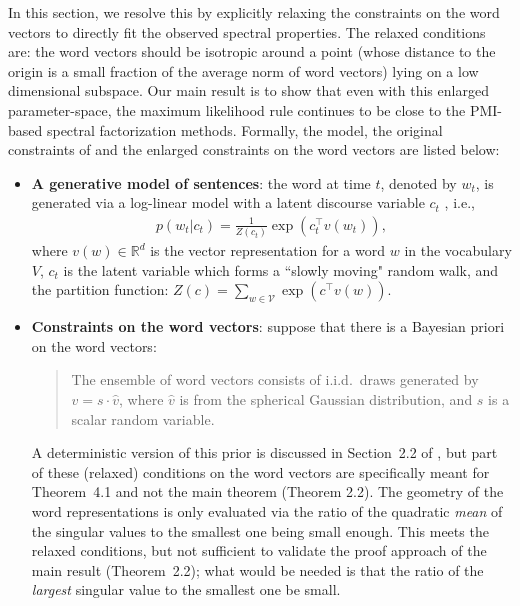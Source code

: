 \documentclass{article} \usepackage{acl2017,times}
\begin{document}
In this section, we  resolve this by explicitly  relaxing the constraints on the word vectors to directly fit the observed spectral properties.  The relaxed conditions are: the word vectors should be isotropic around a point (whose distance to the origin is a  small fraction of the average norm of word vectors) lying on a low dimensional subspace. Our main result is to show that even with this enlarged parameter-space, the maximum likelihood rule continues to be close to the PMI-based spectral factorization methods.  
Formally,  the model, the original constraints of \citep{arora2015rand} and the enlarged constraints on the word vectors are listed  below: 
\begin{itemize}\item {\bf A generative model of sentences}: the word at time $t$, denoted by $w_t$, is generated via a log-linear model with a latent discourse variable $c_t$ \citep{arora2015rand}, i.e.,
    \begin{align}
      p(w_t|c_t) = \frac{1}{Z(c_t)} \exp\left(c_t^{\top}v(w_t)\right), \label{eq:model}
    \end{align}
    where $v(w) \in \mathbb{R}^d$ is the vector representation for a word $w$ in the vocabulary $V$, $c_t$ is the latent variable which forms a ``slowly moving" random walk, and  the partition function:  $Z(c) = \sum_{w\in \mathcal{V}}\exp\left(c^{\top}v(w)\right)$.
    \item {\bf Constraints on the word vectors}: \citep{arora2015rand} suppose that there is a Bayesian priori on the word vectors: 
    \begin{quote}
      The ensemble of word vectors consists of i.i.d.\ draws generated by $v = s\cdot \hat{v}$, where $\hat{v}$ is from the spherical Gaussian distribution, and $s$ is a scalar random variable.
    \end{quote}
A deterministic version of this  prior is  discussed in Section~2.2 of \citep{arora2015rand}, but part of these (relaxed) conditions on the word vectors are specifically meant for Theorem~4.1 and not the main theorem (Theorem 2.2).  The geometry of the word representations is only evaluated via the ratio of the  quadratic {\em mean} of the singular values to the smallest one being small enough. This meets the relaxed conditions, but not sufficient to validate the proof approach of the main result  (Theorem~2.2); what would be needed is that the ratio  of the {\em largest} singular value to the smallest one  be small. 


\end{itemize}
\end{document}
